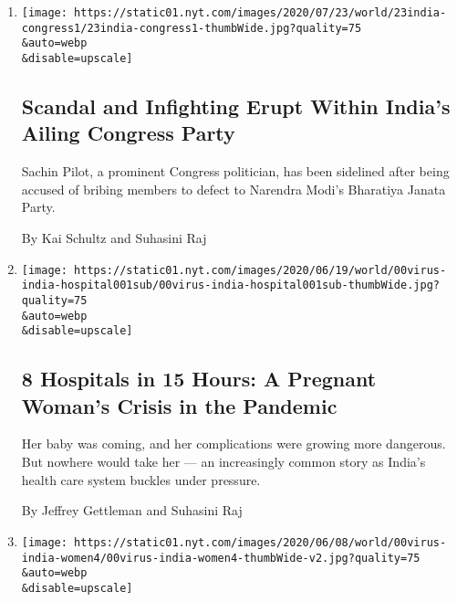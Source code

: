 \begin{enumerate}
\def\labelenumi{\arabic{enumi}.}
\item
  \href{/2020/07/23/world/asia/india-congress-sachin-pilot.html}{}

  \texttt{[image: https://static01.nyt.com/images/2020/07/23/world/23india-congress1/23india-congress1-thumbWide.jpg?quality=75\\\&auto=webp\\\&disable=upscale]}

  \hypertarget{scandal-and-infighting-erupt-within-indias-ailing-congress-party}{%
  \subsection{Scandal and Infighting Erupt Within India's Ailing
  Congress
  Party}\label{scandal-and-infighting-erupt-within-indias-ailing-congress-party}}

  Sachin Pilot, a prominent Congress politician, has been sidelined
  after being accused of bribing members to defect to Narendra Modi's
  Bharatiya Janata Party.

  By Kai Schultz and Suhasini Raj
\item
  \href{/2020/06/21/world/asia/coronavirus-india-hospitals-pregnant.html}{}

  \texttt{[image: https://static01.nyt.com/images/2020/06/19/world/00virus-india-hospital001sub/00virus-india-hospital001sub-thumbWide.jpg?quality=75\\\&auto=webp\\\&disable=upscale]}

  \hypertarget{8-hospitals-in-15-hours-a-pregnant-womans-crisis-in-the-pandemic}{%
  \subsection{8 Hospitals in 15 Hours: A Pregnant Woman's Crisis in the
  Pandemic}\label{8-hospitals-in-15-hours-a-pregnant-womans-crisis-in-the-pandemic}}

  Her baby was coming, and her complications were growing more
  dangerous. But nowhere would take her --- an increasingly common story
  as India's health care system buckles under pressure.

  By Jeffrey Gettleman and Suhasini Raj
\item
  \href{/2020/06/09/world/asia/india-coronavirus-women-economy.html}{}

  \texttt{[image: https://static01.nyt.com/images/2020/06/08/world/00virus-india-women4/00virus-india-women4-thumbWide-v2.jpg?quality=75\\\&auto=webp\\\&disable=upscale]}

  \hypertarget{for-indian-women-the-coronavirus-economy-is-a-devastating-setback}{%
}
\end{enumerate}
